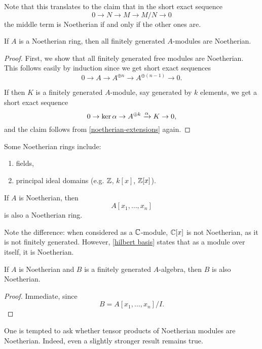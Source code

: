 Note that this translates to the claim that in the short exact sequence
\[ 0 \to N \to M \to M/{N} \to 0\]
the middle term is Noetherian if and only if the other ones are.

\begin{corollary}
  \label{fin gen noetherian}
  If $A$ is a Noetherian ring, then all finitely generated $A$-modules are Noetherian.
\end{corollary}
\begin{proof}
  First, we show that all finitely generated free modules are Noetherian. This follows easily by induction since we get short exact sequences
  \[ 0 \to A \to A^{\oplus n} \to A^{\oplus (n-1)} \to 0.\]

  If then $K$ is a finitely generated $A$-module, say generated by $k$ elements, we get a short exact sequence
  \[ 0 \to \ker{\alpha} \to A^{\oplus k} \xrightarrow{\alpha} K \to 0,\]
  and the claim follows from \cref{noetherian-extensions} again.
\end{proof}


\begin{example}
  Some Noetherian rings include:
  \begin{enumerate}
  \item fields,
  \item principal ideal domains (e.g. $\mathbb Z$, $k[x]$, $\mathbb Z[x]$).
  \end{enumerate}
\end{example}


\begin{theorem}
  \label{hilbert basis}
  If $A$ is Noetherian, then
  \[ A[x_1, \dotsc, x_n]\]
  is also a Noetherian ring.
\end{theorem}

Note the difference: when considered as a $\mathbb C$-module, $\mathbb C[x]$ is not Noetherian, as it is not finitely generated. However, \cref{hilbert basis} states that as a module over itself, it is Noetherian.

\begin{corollary}
  If $A$ is Noetherian and $B$ is a finitely generated $A$-algebra, then $B$ is also Noetherian.
\end{corollary}
\begin{proof}
  Immediate, since
  \[ B = A[x_1, \dotsc, x_n]/{I}.\]
\end{proof}

One is tempted to ask whether tensor products of Noetherian modules are Noetherian. Indeed, even a slightly stronger result remains true.

